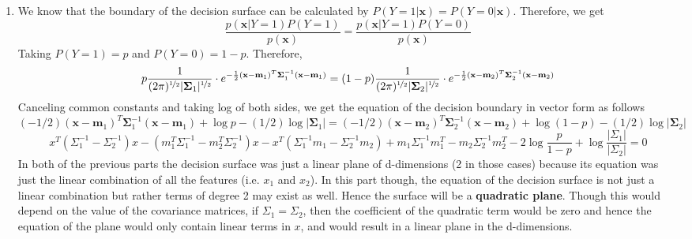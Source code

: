 \documentclass[twoside]{article}
\begin{document}
\begin{enumerate}
	\item
	We know that the boundary of the decision surface can be calculated by $P(Y=1|\mathbf{x})=P(Y=0|\mathbf{x})$.
	Therefore, we get
	\begin{equation*}
		\frac{p(\mathbf{x}|Y=1)P(Y=1)}{p(\mathbf{x})} = \frac{p(\mathbf{x}|Y=1)P(Y=0)}{p(\mathbf{x})}
	\end{equation*}
	Taking $P(Y=1) = p$ and $P(Y=0) = 1 - p$. Therefore,
	\begin{equation*}
		p\frac{1}{(2\pi)^{\nicefrac{1}{2}} |\mathbf{\Sigma}_{1}|^{\nicefrac{1}{2}}}\cdot e^{-\frac{1}{2}(\mathbf{x}-\mathbf{m}_{1})^{T}\mathbf{\Sigma}_{1}^{-1}(\mathbf{x}-\mathbf{m}_{1})} = (1-p)\frac{1}{(2\pi)^{\nicefrac{1}{2}} |\mathbf{\Sigma}_{2}|^{\nicefrac{1}{2}}}\cdot e^{-\frac{1}{2}(\mathbf{x}-\mathbf{m}_{2})^{T}\mathbf{\Sigma}_{2}^{-1}(\mathbf{x}-\mathbf{m}_{2})}
	\end{equation*}
	Canceling common constants and taking log of both sides, we get the equation of the decision boundary in vector form as follows
	\begin{equation*}
		(-1/2)(\mathbf{x}-\mathbf{m}_{1})^{T}\mathbf{\Sigma}_{1}^{-1}(\mathbf{x}-\mathbf{m}_{1}) + \log p -(1/2)\log|\mathbf{\Sigma}_1|= (-1/2)(\mathbf{x}-\mathbf{m}_{2})^{T}\mathbf{\Sigma}_{2}^{-1}(\mathbf{x}-\mathbf{m}_{2}) + \log (1 - p) -(1/2)\log|\mathbf{\Sigma}_2|
	\end{equation*}
	\begin{equation*}
		x^T(\Sigma_1^{-1} - \Sigma_2^{-1})x - (m_1^T\Sigma_1^{-1} - m_2^T\Sigma_2^{-1})x - x^T(\Sigma_1^{-1}m_1 - \Sigma_2^{-1}m_2) + m_1\Sigma_1^{-1}m_1^T - m_2\Sigma_2^{-1}m_2^T -2\log \frac{p}{1-p} + \log\frac{|\Sigma_1|}{|\Sigma_2|} = 0
	\end{equation*}
	In both of the previous parts the decision surface was just a linear plane of d-dimensions (2 in those cases) because its equation was just the linear combination of all the features (i.e. $x_1$ and $x_2$). In this part though, the equation of the decision surface is not just a linear combination but rather terms of degree 2 may exist as well. Hence the surface will be a \textbf{quadratic plane}. Though this would depend on the value of the covariance matrices, if $\Sigma_1 = \Sigma_2$, then the coefficient of the quadratic term would be zero and hence the equation of the plane would only contain linear terms in $x$, and would result in a linear plane in the d-dimensions.

\end{enumerate}
\end{document}
